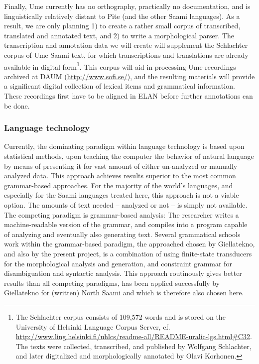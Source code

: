 \documentclass[a4paper,12pt]{article}
\begin{document}
Finally, Ume currently has no orthography, practically no documentation, and is linguistically relatively distant to Pite (and the other Saami languages). As a result, we are only planning 1) to create a rather small corpus of transcribed, translated and annotated text, and 2) to write a morphological parser. The transcription and annotation data we will create will supplement the Schlachter corpus of Ume Saami text, for which transcriptions and translations are already available in digital form\footnote{The Schlachter corpus consists of 109,572 words and is stored on the University of Helsinki Language Corpus Server, cf. \url{http://www.ling.helsinki.fi/uhlcs/readme-all/README-uralic-lgs.html#C32}. The texts were collected, transcribed, and published by Wolfgang Schlachter, and later digitalized and morphologically annotated by Olavi Korhonen.}. This corpus will aid in processing Ume recordings archived at DAUM (\url{http://www.sofi.se/}), and the resulting materials will provide a significant digital collection of lexical items and grammatical information. These recordings first have to be aligned in ELAN before further annotations can be done. 

\subsubsection{Language technology}

Currently, the dominating paradigm within language technology is based upon statistical methods, upon teaching the computer the behavior of natural language by means of presenting it for vast amount of either un-analyzed or manually analyzed data. This approach achieves results superior to the most common grammar-based approaches. For the majority of the world's languages, and especially for the Saami languages treated here, this approach is not a viable option. The amounts of text needed – analyzed or not – is simply not available. The competing paradigm is grammar-based analysis: The researcher writes a machine-readable version of the grammar, and compiles into a program capable of analyzing and eventually also generating text. Several grammatical schools work within the grammar-based paradigm, the approached chosen by Giellatekno, and also by the present project, is a combination of using finite-state transducers for the morphological analysis and generation, and constraint grammar for disambiguation and syntactic analysis. This approach routinously gives better results than all competing paradigms, has been applied successfully by Giellatekno for (written) North Saami and which is therefore also chosen here.
\end{document}
